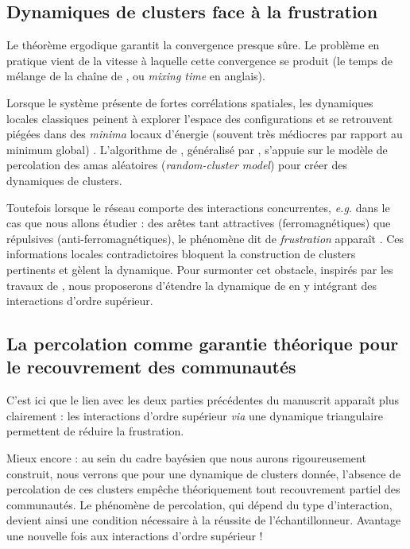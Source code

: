 \subsection{Dynamiques de clusters face à la frustration}

Le théorème ergodique garantit la convergence presque sûre. Le problème en pratique vient de la vitesse à laquelle cette convergence se produit \cite{Robert1996MCMC} (le temps de mélange de la chaîne de , ou \emph{mixing time} en anglais). 

Lorsque le système présente de fortes corrélations spatiales, les dynamiques locales classiques peinent à explorer l'espace des configurations et se retrouvent piégées dans des \emph{minima} locaux d'énergie (souvent très médiocres par rapport au minimum global) \cite{CeleuxRobert2000PoorMixing}.
L'algorithme de \SW{} \cite{SwendsenWang}, généralisé par  \cite{EdwardsSokal}, s'appuie sur le modèle de percolation des amas aléatoires (\emph{random-cluster model}) \cite{FortuinKasteleyn, Grimmett2006} pour créer des dynamiques de clusters. %

Toutefois lorsque le réseau comporte des interactions concurrentes, \emph{e.g.} dans le cas que nous allons étudier : des arêtes tant attractives (ferromagnétiques) que répulsives (anti-ferromagnétiques), le phénomène dit de \emph{frustration} apparaît \cite{FaiblesseSwendsen-WangFrustration, RevueSpinGlassesPercolation2024}. 
Ces informations locales contradictoires bloquent la construction de clusters pertinents et gèlent la dynamique. 
Pour surmonter cet obstacle, inspirés par les travaux de  \cite{KBD1992}, nous proposerons d'étendre la dynamique de \SW{} en y intégrant des interactions d'ordre supérieur. 

\subsection{La percolation comme garantie théorique pour le recouvrement des communautés}


C'est ici que le lien avec les deux parties précédentes du manuscrit apparaît plus clairement : les interactions d'ordre supérieur \emph{via} une dynamique triangulaire permettent de réduire la frustration.

Mieux encore : au sein du cadre bayésien que nous aurons rigoureusement construit, nous verrons que pour une dynamique de clusters donnée, l'absence de percolation de ces clusters empêche théoriquement tout recouvrement partiel des communautés. Le phénomène de percolation, qui dépend du type d'interaction, devient ainsi une condition nécessaire à la réussite de l'échantillonneur. Avantage une nouvelle fois aux interactions d'ordre supérieur !



